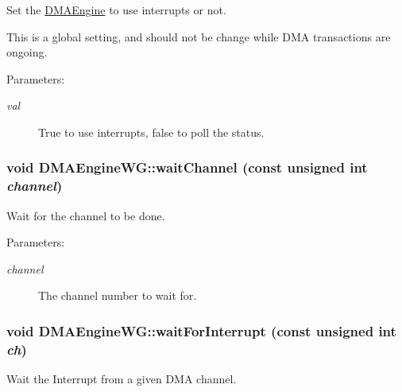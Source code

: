 Set the \hyperlink{classmprace_1_1DMAEngine}{DMAEngine} to use interrupts or not. 

This is a global setting, and should not be change while DMA transactions are ongoing. \begin{Desc}
\item[Parameters:]
\begin{description}
\item[{\em val}]True to use interrupts, false to poll the status.\end{description}
\end{Desc}
\hypertarget{classmprace_1_1DMAEngineWG_b1}{
\subsubsection[waitChannel]{\setlength{\rightskip}{0pt plus 5cm}void DMAEngine\-WG::wait\-Channel (const unsigned int {\em channel})}}
\label{classmprace_1_1DMAEngineWG_b1}


Wait for the channel to be done. 

\begin{Desc}
\item[Parameters:]
\begin{description}
\item[{\em channel}]The channel number to wait for.\end{description}
\end{Desc}
\hypertarget{classmprace_1_1DMAEngineWG_b4}{
\subsubsection[waitForInterrupt]{\setlength{\rightskip}{0pt plus 5cm}void DMAEngine\-WG::wait\-For\-Interrupt (const unsigned int {\em ch})}}
\label{classmprace_1_1DMAEngineWG_b4}


Wait the Interrupt from a given DMA channel. 

